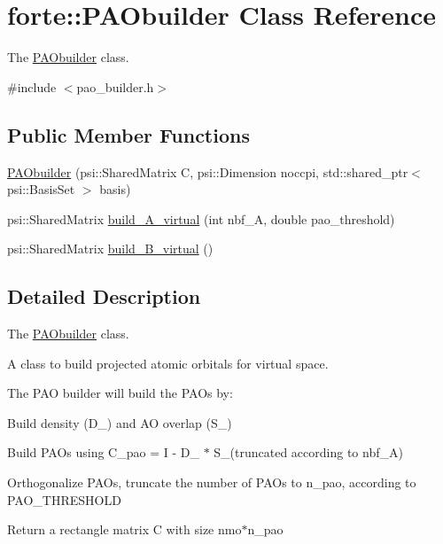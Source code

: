 \hypertarget{classforte_1_1_p_a_obuilder}{}\section{forte\+:\+:P\+A\+Obuilder Class Reference}
\label{classforte_1_1_p_a_obuilder}


The \mbox{\hyperlink{classforte_1_1_p_a_obuilder}{P\+A\+Obuilder}} class.  




{\ttfamily \#include $<$pao\+\_\+builder.\+h$>$}

\subsection*{Public Member Functions}
\begin{DoxyCompactItemize}
\item 
\mbox{\hyperlink{classforte_1_1_p_a_obuilder_a969c35cc76f3cd82e92b863cf24bf666}{P\+A\+Obuilder}} (psi\+::\+Shared\+Matrix C, psi\+::\+Dimension noccpi, std\+::shared\+\_\+ptr$<$ psi\+::\+Basis\+Set $>$ basis)
\item 
psi\+::\+Shared\+Matrix \mbox{\hyperlink{classforte_1_1_p_a_obuilder_a00baa0b6dad033c7e05be344077e3982}{build\+\_\+\+A\+\_\+virtual}} (int nbf\+\_\+A, double pao\+\_\+threshold)
\item 
psi\+::\+Shared\+Matrix \mbox{\hyperlink{classforte_1_1_p_a_obuilder_a516283c1ab351c927424b476fdf77f2a}{build\+\_\+\+B\+\_\+virtual}} ()
\end{DoxyCompactItemize}


\subsection{Detailed Description}
The \mbox{\hyperlink{classforte_1_1_p_a_obuilder}{P\+A\+Obuilder}} class. 

A class to build projected atomic orbitals for virtual space.

The P\+AO builder will build the P\+A\+Os by\+:


\begin{DoxyEnumerate}
\item Build density (D\+\_\+) and AO overlap (S\+\_\+)
\item Build P\+A\+Os using C\+\_\+pao = I -\/ D\+\_\+ $\ast$ S\+\_\+(truncated according to nbf\+\_\+\+A)
\item Orthogonalize P\+A\+Os, truncate the number of P\+A\+Os to n\+\_\+pao, according to P\+A\+O\+\_\+\+T\+H\+R\+E\+S\+H\+O\+LD
\item Return a rectangle matrix C with size nmo$\ast$n\+\_\+pao
\end{DoxyEnumerate}

